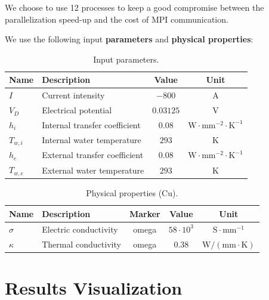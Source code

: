 \documentclass[12pt]{article}
\begin{document}
We choose to use 12 processes to keep a good compromise between the parallelization
speed-up and the cost of MPI communication.

We use the following input \textbf{parameters} and \textbf{physical properties}:

\begin{table}[H]
  \centering
  \begin{tabular}{|l|l|c|c|}
    \hline
    \textbf{Name} & \textbf{Description} & \textbf{Value} & \textbf{Unit} \\ \hline
    $I$ & Current intensity & $-800$ & A \\ \hline
    $V_D$ & Electrical potential & $0.03125$ & V \\ \hline
    $h_i$ & Internal transfer coefficient & $0.08$ & $\mathrm{W \cdot mm^{-2} \cdot K^{-1}}$ \\ \hline
    $T_{w,i}$ & Internal water temperature & $293$ & K \\ \hline
    $h_e$ & External transfer coefficient & $0.08$ & $\mathrm{W \cdot mm^{-2} \cdot K^{-1}}$ \\ \hline
    $T_{w,e}$ & External water temperature & $293$ & K \\ \hline
  \end{tabular}
  \caption{Input parameters.}
  \label{tab:input_parameters}
\end{table}

\begin{table}[H]
  \centering
  \begin{tabular}{|l|l|c|c|c|}
    \hline
    \textbf{Name} & \textbf{Description} & \textbf{Marker} & \textbf{Value} & \textbf{Unit} \\ \hline
    $\sigma$ & Electric conductivity & omega & $58 \cdot 10^3$ & $\mathrm{S \cdot mm^{-1}}$ \\ \hline
    $\kappa$ & Thermal conductivity & omega & $0.38$ & $\mathrm{W/(mm \cdot K)}$ \\ \hline
  \end{tabular}
  \caption{Physical properties (Cu).}
  \label{tab:physical_properties}
\end{table}

\section{Results Visualization}
\end{document}

